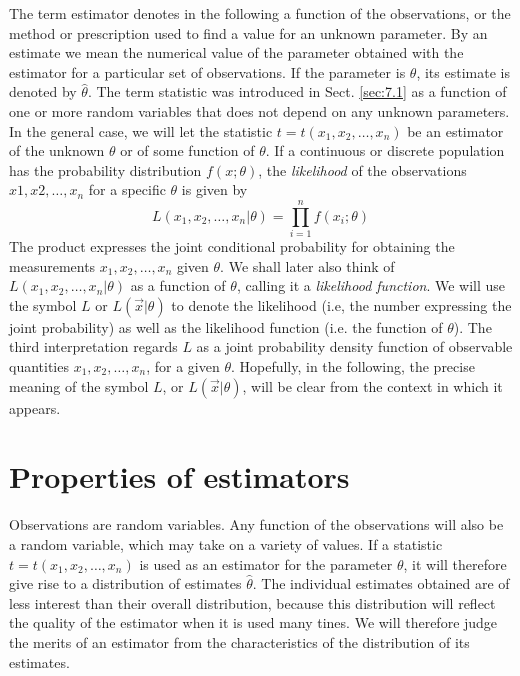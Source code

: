 \documentclass[../main.tex]{subfiles}
\begin{document}
The term estimator denotes in the following a function of the observations,
or the method or prescription used to find a value for an unknown parameter.
By an estimate we mean the numerical value of the parameter obtained with the estimator for a particular set of observations.
If the parameter is $\theta$, its estimate is denoted by $\hat{\theta}$.
The term statistic was introduced in Sect. \ref{sec:7.1}
as a function of one or more random variables that does not depend on any unknown parameters.
In the general case,
we will let the statistic $t = t(x_1,x_2,\ldots,x_n)$
be an estimator of the unknown $\theta$ or of some function of $\theta$.
If a continuous or discrete population has the probability distribution $f(x; \theta)$,
the \emph{likelihood} of the observations $x1, x2, \ldots, x_n$ for a specific $\theta$ is given by
%
\begin{equation}
    L(x_1, x_2, \ldots, x_n | \theta) = \prod_{i=1}^n f(x_i ; \theta)
    \label{eq:8.1}
\end{equation}
%
The product expresses the joint conditional probability for obtaining the
measurements $x_1, x_2, \ldots, x_n$ given $\theta$.
We shall later also think of $L(x_1, x_2, \ldots, x_n | \theta)$ as a function of $\theta$,
calling it a \emph{likelihood function}.
We will use the symbol $L$ or $L(\vec{x} | \theta)$ to denote the likelihood
(i.e, the number expressing the joint probability)
as well as the likelihood function
(i.e. the function of $\theta$).
The third interpretation regards $L$ as a joint probability density function of observable quantities $x_1, x_2, \ldots, x_n$, for a given $\theta$.
Hopefully, in the following,
the precise meaning of the symbol $L$, or $L(\vec{x} | \theta)$,
will be clear from the context in which it appears.

\section{Properties of estimators}

Observations are random variables.
Any function of the observations will also be a random variable,
which may take on a variety of values.
If a statistic $t = t(x_1,x_2,\ldots,x_n)$ is used as an estimator for the parameter $\theta$,
it will therefore give rise to a distribution of estimates $\hat{\theta}$.
The individual estimates obtained are of less interest than their overall distribution,
because this distribution will reflect the quality of the estimator when it is used many tines.
We will therefore judge the merits of an estimator from the characteristics of the distribution of its estimates.
\end{document}
